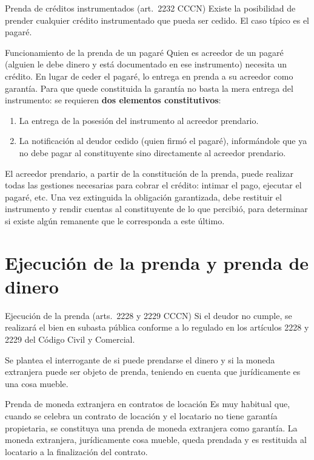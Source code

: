 \documentclass[12pt,oneside]{book}
\begin{document}
\begin{definition}{Prenda de créditos instrumentados (art.\ 2232 CCCN)}
Existe la posibilidad de prender cualquier crédito instrumentado que pueda ser cedido. El caso típico es el pagaré.
\end{definition}

\begin{example}{Funcionamiento de la prenda de un pagaré}
Quien es acreedor de un pagaré (alguien le debe dinero y está documentado en ese instrumento) necesita un crédito. En lugar de ceder el pagaré, lo entrega en prenda a su acreedor como garantía. Para que quede constituida la garantía no basta la mera entrega del instrumento: se requieren \textbf{dos elementos constitutivos}:
\begin{enumerate}
    \item La entrega de la posesión del instrumento al acreedor prendario.
    \item La notificación al deudor cedido (quien firmó el pagaré), informándole que ya no debe pagar al constituyente sino directamente al acreedor prendario.
\end{enumerate}
\end{example}

El acreedor prendario, a partir de la constitución de la prenda, puede realizar todas las gestiones necesarias para cobrar el crédito: intimar el pago, ejecutar el pagaré, etc. Una vez extinguida la obligación garantizada, debe restituir el instrumento y rendir cuentas al constituyente de lo que percibió, para determinar si existe algún remanente que le corresponda a este último.

\section{Ejecución de la prenda y prenda de dinero}

\begin{definition}{Ejecución de la prenda (arts.\ 2228 y 2229 CCCN)}
Si el deudor no cumple, se realizará el bien en subasta pública conforme a lo regulado en los artículos 2228 y 2229 del Código Civil y Comercial.
\end{definition}

Se plantea el interrogante de si puede prendarse el dinero y si la moneda extranjera puede ser objeto de prenda, teniendo en cuenta que jurídicamente es una cosa mueble.

\begin{example}{Prenda de moneda extranjera en contratos de locación}
Es muy habitual que, cuando se celebra un contrato de locación y el locatario no tiene garantía propietaria, se constituya una prenda de moneda extranjera como garantía. La moneda extranjera, jurídicamente cosa mueble, queda prendada y es restituida al locatario a la finalización del contrato.
\end{example}
\end{document}
